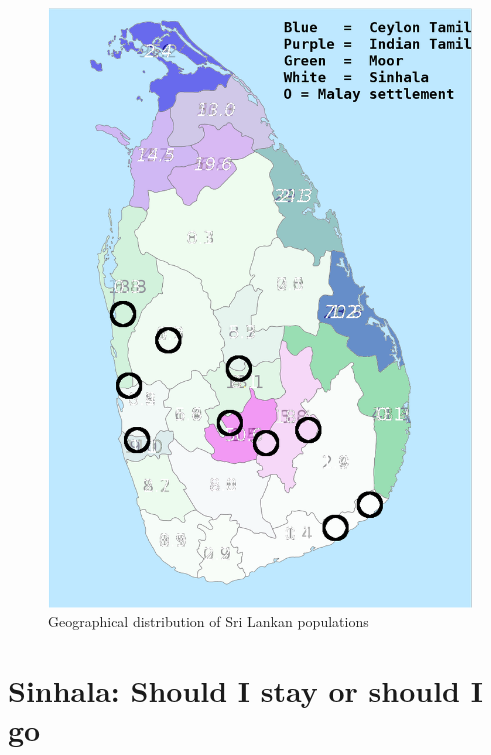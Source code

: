 \documentclass[a4paper,utf8]{article}
\begin{document}
\begin{figure}
 \centering
 \includegraphics[height=.4\textheight]{./srilankacomposite.png}
 \caption{Geographical distribution of Sri Lankan populations}
\end{figure}

\newpage
\section{Sinhala: Should I stay or should I go}
 
\end{document}
